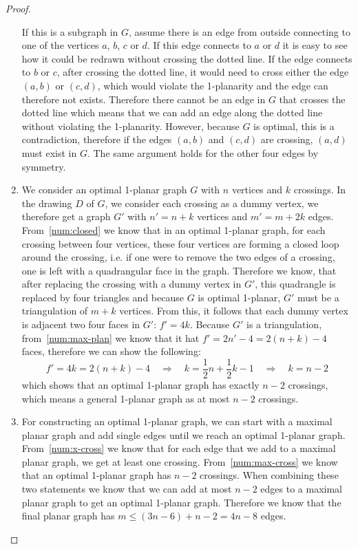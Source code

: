 \documentclass[a4paper,12pt,headsepline]{scrartcl}
\begin{document}
\begin{proof}
\begin{enumerate}
\begin{center}
      \end{center}
      If this is a subgraph in $G$, assume there is an edge from outside connecting to one of the vertices $a$, $b$, $c$ or $d$.
      If this edge connects to $a$ or $d$ it is easy to see how it could be redrawn without crossing the dotted line.
      If the edge connects to $b$ or $c$, after crossing the dotted line, it would need to cross either the edge $(a,b)$ or $(c,d)$, which would violate the 1-planarity and the edge can therefore not exists.
      Therefore there cannot be an edge in $G$ that crosses the dotted line which means that we can add an edge along the dotted line without violating the 1-planarity.
      However, because $G$ is optimal, this is a contradiction, therefore if the edges $(a,b)$ and $(c,d)$ are crossing, $(a,d)$ must exist in $G$.
      The same argument holds for the other four edges by symmetry.
    \item\label{num:max-cross} We consider an optimal 1-planar graph $G$ with $n$ vertices and $k$ crossings.
      In the drawing $D$ of $G$, we consider each crossing as a dummy vertex, we therefore get a graph $G'$ with $n'=n+k$ vertices and $m'=m+2k$ edges.
      From~\ref{num:closed} we know that in an optimal 1-planar graph, for each crossing between four vertices, these four vertices are forming a closed loop around the crossing, i.e. if one were to remove the two edges of a crossing, one is left with a quadrangular face in the graph.
      Therefore we know, that after replacing the crossing with a dummy vertex in $G'$, this quadrangle is replaced by four triangles and because $G$ is optimal 1-planar, $G'$ must be a triangulation of $m+k$ vertices.
      From this, it follows that each dummy vertex is adjacent two four faces in $G'$: $f'=4k$.
      Because $G'$ is a triangulation, from~\ref{num:max-plan} we know that it hat $f'=2n'-4=2(n+k)-4$ faces, therefore we can show the following:
      \[ f' = 4k = 2(n+k)-4 \quad\Rightarrow\quad k = \frac{1}{2}n+\frac{1}{2}k-1 \quad\Rightarrow\quad k = n-2 \]
      which shows that an optimal 1-planar graph has exactly $n-2$ crossings, which means a general 1-planar graph as at most $n-2$ crossings.
    \item For constructing an optimal 1-planar graph, we can start with a maximal planar graph and add single edges until we reach an optimal 1-planar graph.
      From~\ref{num:x-cross} we know that for each edge that we add to a maximal planar graph, we get at least one crossing.
      From~\ref{num:max-cross} we know that an optimal 1-planar graph has $n-2$ crossings.
      When combining these two statements we know that we can add at most $n-2$ edges to a maximal planar graph to get an optimal 1-planar graph.
      Therefore we know that the final planar graph has $m \le (3n-6) + n-2 = 4n-8$ edges.
  \end{enumerate}
\end{proof}
\end{document}
